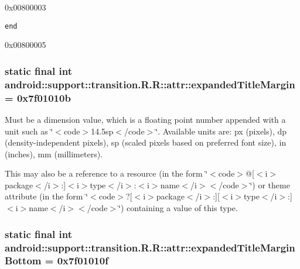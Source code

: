 0x00800003

{\tt end}

0x00800005\hypertarget{classandroid_1_1support_1_1transition_1_1_r_1_1attr_bfc0b4c55e188ccdfe4edbb79d8dedc8}{
\subsubsection[{expandedTitleMargin}]{\setlength{\rightskip}{0pt plus 5cm}static final int android::support::transition.R.R::attr::expandedTitleMargin = 0x7f01010b}}
\label{classandroid_1_1support_1_1transition_1_1_r_1_1attr_bfc0b4c55e188ccdfe4edbb79d8dedc8}


Must be a dimension value, which is a floating point number appended with a unit such as \char`\"{}$<$code$>$14.5sp$<$/code$>$\char`\"{}. Available units are: px (pixels), dp (density-independent pixels), sp (scaled pixels based on preferred font size), in (inches), mm (millimeters). 

This may also be a reference to a resource (in the form \char`\"{}$<$code$>$@\mbox{[}$<$i$>$package$<$/i$>$:\mbox{]}$<$i$>$type$<$/i$>$:$<$i$>$name$<$/i$>$$<$/code$>$\char`\"{}) or theme attribute (in the form \char`\"{}$<$code$>$?\mbox{[}$<$i$>$package$<$/i$>$:\mbox{]}\mbox{[}$<$i$>$type$<$/i$>$:\mbox{]}$<$i$>$name$<$/i$>$$<$/code$>$\char`\"{}) containing a value of this type. \hypertarget{classandroid_1_1support_1_1transition_1_1_r_1_1attr_785d6f23d632e68c6324d2e7fe92946c}{
\subsubsection[{expandedTitleMarginBottom}]{\setlength{\rightskip}{0pt plus 5cm}static final int android::support::transition.R.R::attr::expandedTitleMarginBottom = 0x7f01010f}}
\label{classandroid_1_1support_1_1transition_1_1_r_1_1attr_785d6f23d632e68c6324d2e7fe92946c}


